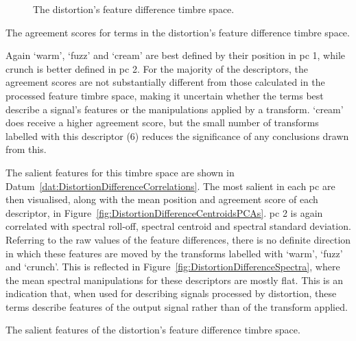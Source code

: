 \begin{figure}[h!]
{					\label{fig:DistortionDifferencePCA3-2}
				}
				\caption{The distortion's feature difference timbre space.}
				\label{fig:DistortionDifferencePCAs}
			\end{figure}

			\begin{table}[h!]
				\centering
				
				\centering
				\caption{The agreement scores for terms in the 
					 distortion's feature difference timbre space.}
				\label{tab:DistortionDifferenceAgreements}
			\end{table}

			Again `warm', `fuzz' and `cream' are best defined by their position in \acrshort{pc} 1, while
			crunch is better defined in \acrshort{pc} 2. For the majority of the descriptors, the agreement
			scores are not substantially different from those calculated in the processed feature timbre space,
			making it uncertain whether the terms best describe a signal's features or the manipulations
			applied by a transform. `cream' does receive a higher agreement score, but the small number of
			transforms labelled with this descriptor (6) reduces the significance of any conclusions drawn from
			this.

			The salient features for this timbre space are shown in
			Datum~\ref{dat:DistortionDifferenceCorrelations}. The most salient in each \acrshort{pc} are then
			visualised, along with the mean position and agreement score of each descriptor, in
			Figure~\ref{fig:DistortionDifferenceCentroidsPCAs}. \acrshort{pc} 2 is again correlated with
			spectral roll-off, spectral centroid and spectral standard deviation.  Referring to the raw values
			of the feature differences, there is no definite direction in which these features are moved by the
			transforms labelled with `warm', `fuzz' and `crunch'. This is reflected in
			Figure~\ref{fig:DistortionDifferenceSpectra}, where the mean spectral manipulations for these
			descriptors are mostly flat. This is an indication that, when used for describing signals processed
			by distortion, these terms describe features of the output signal rather than of the transform
			applied.

			\begin{datum}[h!]
				\centering
				\begin{minipage}{0.9\textwidth}
					
				\end{minipage}
				\caption{The salient features of the distortion's
					 feature difference timbre space.}
				\label{dat:DistortionDifferenceCorrelations}
			\end{datum}

